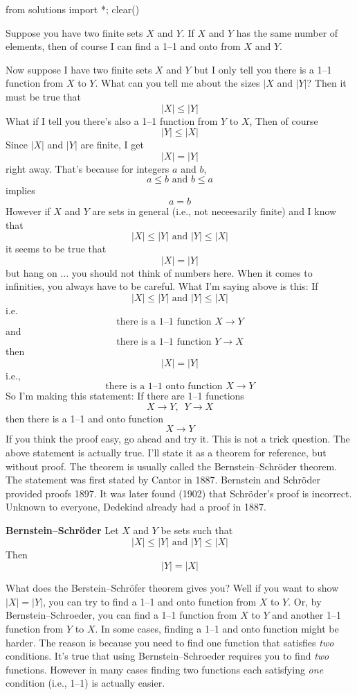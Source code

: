 \begin{python0}
from solutions import *; clear()
\end{python0}

Suppose you have two finite sets $X$ and $Y$.
If $X$ and $Y$ has the same number of elements,
then of course I can find a 1--1 and onto from $X$ and $Y$.

Now suppose I have two finite sets $X$ and $Y$
but I only tell you there is a 1--1 function from $X$ to $Y$.
What can you tell me about the sizes $|X$ and $|Y|$?
Then it must be true that
\[
|X| \leq |Y|
\]
What if I tell you there's also a 1--1 function from $Y$ to $X$,
Then of course
\[
|Y| \leq |X|
\]
Since $|X|$ and $|Y|$ are finite, I get
\[
|X| = |Y|
\]
right away.
That's because for integers $a$ and $b$,
\[
a \leq b
\text{ and }
b \leq a
\]
implies
\[
a = b
\]
However if $X$ and $Y$ are sets in general (i.e., not neceesarily finite)
and I know that
\[
|X| \leq |Y|
\text{ and }
|Y| \leq |X|
\]
it seems to be true that
\[
|X| = |Y|
\]
but hang on ...
you should not think of numbers here.
When it comes to infinities, you always have to be careful.
What I'm saying above is this:
If
\[
|X| \leq |Y|
\text{ and }
|Y| \leq |X|
\]
i.e. 
\[
\text{there is a 1--1 function $X \rightarrow Y$}
\]
and
\[
\text{there is a 1--1 function $Y \rightarrow X$}
\]
then
\[
|X| = |Y|
\]
i.e.,
\[
\text{there is a 1--1 onto function $X \rightarrow Y$}
\]
So I'm making this statement:
If there are 1--1 functions
\[
X \rightarrow Y, \,\,\, Y \rightarrow X
\]
then there is a 1--1 and onto function
\[
X \rightarrow Y
\]
If you think the proof easy, go ahead and try it.
This is not a trick question.
The above statement is actually true. 
I'll state it as a theorem for reference, but without proof.
The theorem is usually called the
Bernstein--Schr\"oder theorem.
The statement was first stated by Cantor in 1887.
Bernstein and Schr\"oder provided proofs 1897.
It was later found (1902) that Schr\"oder's proof is incorrect.
Unknown to everyone, Dedekind already
had a proof in 1887.

\begin{thm}
  \textnormal{\textbf{Bernstein--Schr\"oder}}
  Let $X$ and $Y$ be sets such that
  \[
  |X| \leq |Y| \text{ and }
  |Y| \leq |X|
  \]
  Then
  \[
  |Y| = |X|
  \]
\end{thm}
  

What does the Berstein--Schr\"ofer theorem gives you?
Well if you want to show $|X| = |Y|$, you can try to find
a 1--1 and onto function from $X$ to $Y$.
Or, by Bernstein--Schroeder, you can find a 1--1 function
from $X$ to $Y$ and another 1--1 function from $Y$ to $X$.
In some cases, finding a 1--1 and onto function might be harder.
The reason is because you need to find one function that satisfies
\textit{two} conditions.
It's true that using Bernstein--Schroeder requires you
to find \textit{two} functions.
However in many cases finding
two functions each satisfying \textit{one} condition (i.e., 1--1)
is actually easier.

